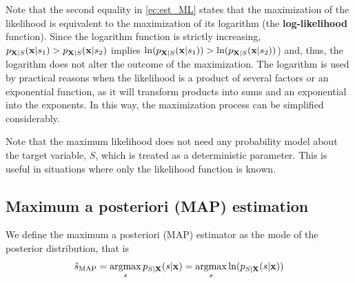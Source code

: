 \begin{example}[ML Estimation]

\end{example}



{Note that the second equality in \eqref{ec:est_ML} states that the maximization of the likelihood is equivalent to the maximization of its logarithm (the \textbf{log-likelihood} function). Since the logarithm function is strictly increasing, $p_{{\bf X}|S}({\bf x}|s_1) > p_{{\bf X}|S}({\bf x}|s_2)$ implies $\ln(p_{{\bf X}|S}({\bf x}|s_1)) > \ln(p_{{\bf X}|S}({\bf x}|s_2))$) and, thus, the logarithm does not alter the outcome of the maximization}. The logarithm is used by practical reasons when the likelihood is a product of several factors or an exponential function, as it will transform products into sums and an exponential into the exponents. In this way, the maximization process can be simplified considerably.

{Note that the maximum likelihood does not need any probability model about the target variable, $S$, which is treated as a deterministic parameter. This is useful in situations where only the likelihood function is known}.


\subsection{Maximum a posteriori (MAP) estimation}

We define the maximum a posteriori (MAP) estimator as the mode of the posterior distribution, that is
\begin{equation}
\hat s_{\text{MAP}} = \operatorname*{argmax}_{s} p_{{S|\bf X}}(s|{\bf x})
                    = \operatorname*{argmax}_{s} \ln(p_{{S|\bf X}}(s|{\bf x}))
                   \label{ec:est_MAP}
\end{equation}


